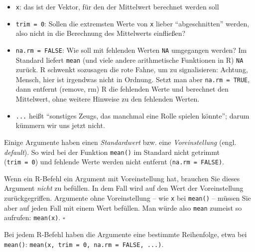 \documentclass[
  letterpaper,
]{scrbook}
\providecommand{\tightlist}{%
  \setlength{\itemsep}{0pt}\setlength{\parskip}{0pt}}\usepackage{longtable,booktabs,array}
\theoremstyle{definition}
\theoremstyle{definition}
\theoremstyle{definition}
\theoremstyle{remark}
\begin{document}
\begin{itemize}
\tightlist
\item
  \texttt{x}: das ist der Vektor, für den der Mittelwert berechnet
  werden soll
\item
  \texttt{trim\ =\ 0}: Sollen die extremsten Werte von \texttt{x} lieber
  \enquote{abgeschnitten} werden, also nicht in die Berechnung des
  Mittelwerts einfließen?
\item
  \texttt{na.rm\ =\ FALSE}: Wie soll mit fehlenden Werten \texttt{NA}
  umgegangen werden? Im Standard liefert \texttt{mean} (und viele andere
  arithmetische Funktionen in R) \texttt{NA} zurück. R schwenkt
  sozusagen die rote Fahne, um zu signalisieren: Achtung, Mensch, hier
  ist irgendwas nicht in Ordnung. Setzt man aber
  \texttt{na.rm\ =\ TRUE}, dann entfernt (remove, rm) R die fehlenden
  Werte und berechnet den Mittelwert, ohne weitere Hinweise zu den
  fehlenden Werten.
\item
  \texttt{...} heißt \enquote{sonstiges Zeugs, das manchmal eine Rolle
  spielen könnte}; darum kümmern wir uns jetzt nicht.
\end{itemize}

Einige Argumente haben einen \emph{Standardwert} bzw. eine
\emph{Voreinstellung} (engl. \emph{default}). So wird bei der Funktion
\texttt{mean()} im Standard nicht getrimmt (\texttt{trim\ =\ 0}) und
fehlende Werte werden nicht entfernt (\texttt{na.rm\ =\ FALSE)}.

\begin{tcolorbox}[enhanced jigsaw, colbacktitle=quarto-callout-note-color!10!white, toptitle=1mm, colframe=quarto-callout-note-color-frame, breakable, toprule=.15mm, bottomrule=.15mm, bottomtitle=1mm, left=2mm, opacitybacktitle=0.6, colback=white, arc=.35mm, coltitle=black, title=\textcolor{quarto-callout-note-color}{\faInfo}\hspace{0.5em}{Hinweis}, opacityback=0, rightrule=.15mm, leftrule=.75mm, titlerule=0mm]

Wenn ein R-Befehl ein Argument mit Voreinstellung hat, brauchen Sie
dieses Argument \emph{nicht} zu befüllen. In dem Fall wird auf den Wert
der Voreinstellung zurückgegriffen. Argumente ohne Voreinstellung -- wie
\texttt{x} bei \texttt{mean()} -- müssen Sie aber auf jeden Fall mit
einem Wert befüllen. Man würde also \texttt{mean} zumeist so aufrufen:
\texttt{mean(x)}. \(\square\)

\end{tcolorbox}

Bei jedem R-Befehl haben die Argumente eine bestimmte Reihenfolge, etwa
bei \texttt{mean()}:
\texttt{mean(x,\ trim\ =\ 0,\ na.rm\ =\ FALSE,\ ...)}.
\end{document}
